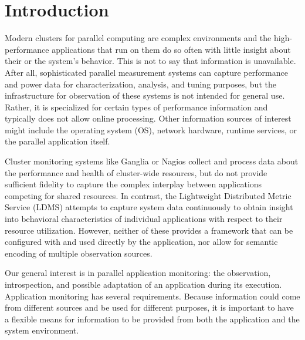 \section{Introduction}
%
\par
%
Modern clusters for parallel computing are complex environments and
the high-performance applications that run on them do so often with
little insight about their or the system's behavior.
%
This is not to say that information is unavailable. 
%
After all, sophisticated parallel measurement systems can capture performance and
power data for characterization, analysis, and tuning purposes, but
the infrastructure for observation of these systems is not intended
for general use.
%
Rather, it is specialized for certain types of performance information
and typically does not allow online processing.
%
Other information sources of interest might include the
operating system (OS), network hardware, runtime services, or the
parallel application itself.
%
\par
%
Cluster monitoring systems like Ganglia \cite{massie2004ganglia} or
Nagios \cite{katsaros2011building} collect and process data about the
performance and health of cluster-wide resources, but do not provide
sufficient fidelity to capture the complex interplay between
applications competing for shared resources.
%
In contrast, the Lightweight Distributed Metric Service
\cite{agelastos2014lightweight} (LDMS) attempts to capture system data
continuously to obtain insight into behavioral characteristics of
individual applications with respect to their resource utilization.
%
However, neither of these provides a framework that can be configured
with and used directly by the application, nor allow for semantic
encoding of multiple observation sources.
%
\par
%
Our general interest is in parallel application monitoring: the
observation, introspection, and possible adaptation of an application
during its execution.
%
Application monitoring has several requirements.
%
Because information could come from different sources and be used for
different purposes, it is important to have a flexible means for
information to be provided from both the application and the system
environment.
%
